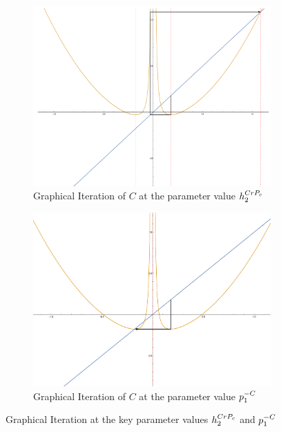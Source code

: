 \begin{figure}[h]
	\centering
	\begin{subfigure}[b]{0.5\textwidth}
			\includegraphics[width=\textwidth]{./img/c1}
			\caption{Graphical Iteration of $C$ at the parameter value $h^{CrP_c}_2$}
			\label{itright}
	\end{subfigure}%
	\begin{subfigure}[b]{0.5\textwidth}
			\includegraphics[width=\textwidth]{./img/c2}
			\caption{Graphical Iteration of $C$ at the parameter value $p^{-C}_1$}
			\label{itleft}%
	\end{subfigure}
	\caption{Graphical Iteration at the key parameter values $h^{CrP_c}_2$ and $p^{-C}_1$}\label{fig:cgi}
\end{figure}

